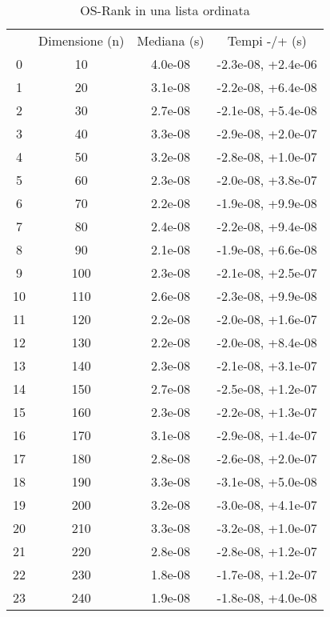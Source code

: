 \begin{table}
\centering
\caption{OS-Rank in una lista ordinata}
\label{OS-Rank in una lista ordinata}
\begin{adjustbox}{width=1\textwidth/2}
\begin{tabular}{|c|c|c|c|}
\hline
 & Dimensione (n) & Mediana (s) & Tempi -/+ (s) \\
0 & 10 & 4.0e-08 & -2.3e-08, +2.4e-06 \\
\cline{1-4}
1 & 20 & 3.1e-08 & -2.2e-08, +6.4e-08 \\
\cline{1-4}
2 & 30 & 2.7e-08 & -2.1e-08, +5.4e-08 \\
\cline{1-4}
3 & 40 & 3.3e-08 & -2.9e-08, +2.0e-07 \\
\cline{1-4}
4 & 50 & 3.2e-08 & -2.8e-08, +1.0e-07 \\
\cline{1-4}
5 & 60 & 2.3e-08 & -2.0e-08, +3.8e-07 \\
\cline{1-4}
6 & 70 & 2.2e-08 & -1.9e-08, +9.9e-08 \\
\cline{1-4}
7 & 80 & 2.4e-08 & -2.2e-08, +9.4e-08 \\
\cline{1-4}
8 & 90 & 2.1e-08 & -1.9e-08, +6.6e-08 \\
\cline{1-4}
9 & 100 & 2.3e-08 & -2.1e-08, +2.5e-07 \\
\cline{1-4}
10 & 110 & 2.6e-08 & -2.3e-08, +9.9e-08 \\
\cline{1-4}
11 & 120 & 2.2e-08 & -2.0e-08, +1.6e-07 \\
\cline{1-4}
12 & 130 & 2.2e-08 & -2.0e-08, +8.4e-08 \\
\cline{1-4}
13 & 140 & 2.3e-08 & -2.1e-08, +3.1e-07 \\
\cline{1-4}
14 & 150 & 2.7e-08 & -2.5e-08, +1.2e-07 \\
\cline{1-4}
15 & 160 & 2.3e-08 & -2.2e-08, +1.3e-07 \\
\cline{1-4}
16 & 170 & 3.1e-08 & -2.9e-08, +1.4e-07 \\
\cline{1-4}
17 & 180 & 2.8e-08 & -2.6e-08, +2.0e-07 \\
\cline{1-4}
18 & 190 & 3.3e-08 & -3.1e-08, +5.0e-08 \\
\cline{1-4}
19 & 200 & 3.2e-08 & -3.0e-08, +4.1e-07 \\
\cline{1-4}
20 & 210 & 3.3e-08 & -3.2e-08, +1.0e-07 \\
\cline{1-4}
21 & 220 & 2.8e-08 & -2.8e-08, +1.2e-07 \\
\cline{1-4}
22 & 230 & 1.8e-08 & -1.7e-08, +1.2e-07 \\
\cline{1-4}
23 & 240 & 1.9e-08 & -1.8e-08, +4.0e-08 \\

\end{tabular}
\end{adjustbox}
\end{table}
